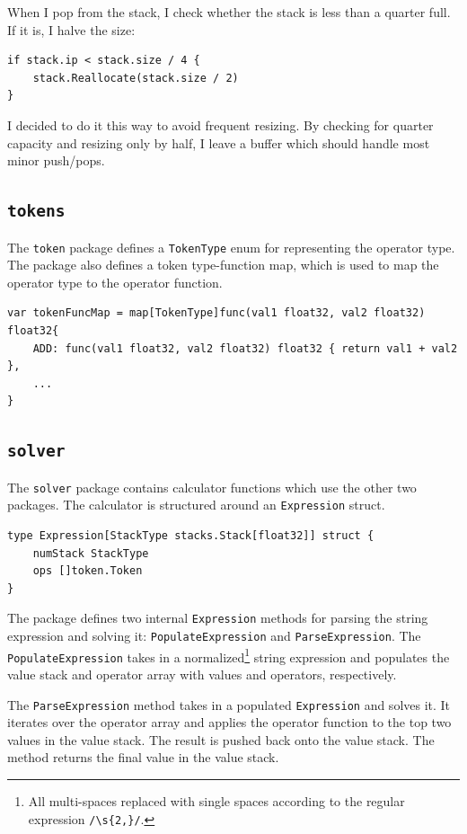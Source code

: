 \documentclass[a4paper,11pt]{article}
\begin{document}
    When I pop from the stack, I check whether the stack is less than a quarter full. If it is, I halve the size:
    \begin{verbatim}
if stack.ip < stack.size / 4 {
    stack.Reallocate(stack.size / 2)
}
    \end{verbatim}

    I decided to do it this way to avoid frequent resizing. By checking for quarter capacity and resizing only by half, I leave a buffer which should handle most minor push/pops.

    \subsection*{\texttt{tokens}}
    
    The \texttt{token} package defines a \texttt{TokenType} enum for representing the operator type. The package also defines a token type-function map, which is used to map the operator type to the operator function.

    \begin{verbatim}
var tokenFuncMap = map[TokenType]func(val1 float32, val2 float32) float32{
    ADD: func(val1 float32, val2 float32) float32 { return val1 + val2 },
    ...
}
    \end{verbatim}

    \subsection*{\texttt{solver}}

    The \texttt{solver} package contains calculator functions which use the other two packages. The calculator is structured around an \texttt{Expression} struct.
    
    \begin{verbatim}
type Expression[StackType stacks.Stack[float32]] struct {
    numStack StackType
    ops []token.Token
}
    \end{verbatim}

    The package defines two internal \texttt{Expression} methods for parsing the string expression and solving it: \texttt{PopulateExpression} and \texttt{ParseExpression}. The  \texttt{PopulateExpression} takes in a normalized\footnote{All multi-spaces replaced with single spaces according to the regular expression \texttt{/\textbackslash s\{2,\}/}.} string expression and populates the value stack and operator array with values and operators, respectively.

    The \texttt{ParseExpression} method takes in a populated \texttt{Expression} and solves it. It iterates over the operator array and applies the operator function to the top two values in the value stack. The result is pushed back onto the value stack. The method returns the final value in the value stack.
\end{document}
